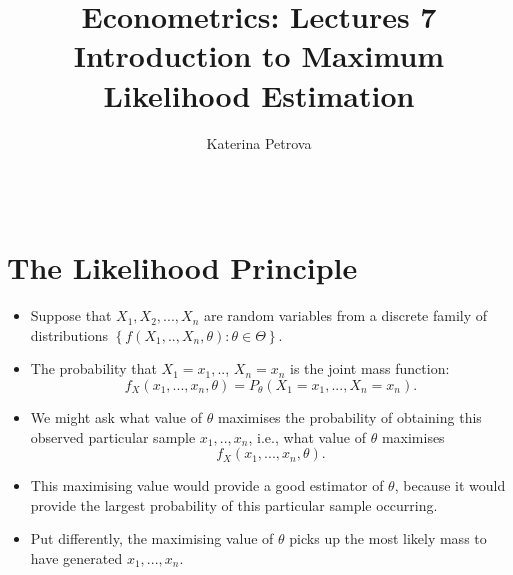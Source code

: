 \documentclass[notes=show]{beamer}
\begin{document}
\title{Econometrics: Lectures 7\\
Introduction to Maximum Likelihood Estimation}
\author{Katerina Petrova \ \ \ \ \ \ \ \ \ \ \ \ \ \ \ \ \ \ \ \ \ \ \ \ \ \
\ \ \ \ \ \ \ \ \ \ \ \ \ \ \ \ \ \ \ \ \ \ \ \ \ \ \ \ \ \ \ \ \ \ \ \ \ \
\ \ \ \ \ \ \ \ \ \ \ \ \ \ \ \ \ \ \ \ \ \ \ }
\date{}
\maketitle

\section{The Likelihood Principle}

\begin{frame}%


\begin{itemize}
\item Suppose that $X_{1},X_{2},...,X_{n}$ are random variables from a
discrete family of distributions $\left\{ f\left( X_{1},..,X_{n},\theta
\right) :\theta \in \Theta \right\} $.

\item The probability that $X_{1}=x_{1},..$, $X_{n}=x_{n}$ is the joint mass
function:%
\begin{equation*}
f_{X}\left( x_{1},...,x_{n},\theta \right) =P_{\theta }\left(
X_{1}=x_{1},...,X_{n}=x_{n}\right) .
\end{equation*}

\item We might ask what value of $\theta $ maximises the probability of
obtaining this observed particular sample $x_{1},..,x_{n}$, i.e., what value
of $\theta $ maximises%
\begin{equation*}
f_{X}\left( x_{1},...,x_{n},\theta \right) .
\end{equation*}

\item This maximising value would provide a good estimator of $\theta $,
because it would provide the largest probability of this particular sample
occurring.

\item Put differently, the maximising value of $\theta $ picks up the most
likely mass to have generated $x_{1},...,x_{n}$.
\end{itemize}

\end{frame}%
\end{document}
